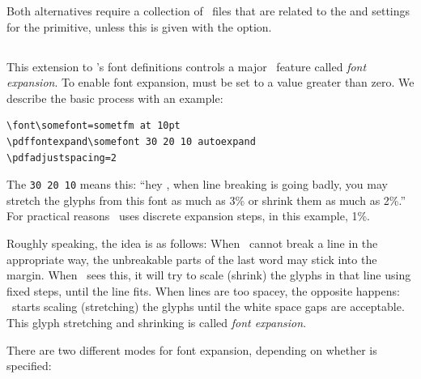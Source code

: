 \documentclass{pdftexmanual}
\begin{document}
Both alternatives require a collection of \TFM\ files that are
related to the  and  settings
for the  primitive, unless this is given with the
 option.

\subsection{}

This extension to \TEX's font definitions controls a major \PDFTEX\
feature called \emph{font expansion}. To enable font expansion,
 must be set to a value greater than zero. We
describe the basic process with an example:

\begin{verbatim}
\font\somefont=sometfm at 10pt
\pdffontexpand\somefont 30 20 10 autoexpand
\pdfadjustspacing=2
\end{verbatim}

The \verb|30 20 10| means this: ``hey \TEX, when line breaking is going
badly, you may stretch the glyphs from this font as much as 3\% or
shrink them as much as 2\%.'' For practical reasons \PDFTEX\ uses
discrete expansion steps, in this example, 1\%.

Roughly speaking, the idea is as follows: When \TEX\ cannot break a line
in the appropriate way, the unbreakable parts of the last word may stick
into the margin. When \PDFTEX\ sees this, it will try to scale (shrink)
the glyphs in that line using fixed steps, until the line fits. When
lines are too spacey, the opposite happens: \PDFTEX\ starts scaling
(stretching) the glyphs until the white space gaps are acceptable. This
glyph stretching and shrinking is called \emph{font expansion}.

There are two different modes for font expansion, depending on whether
\type{autoexpand} is specified:
\end{document}
